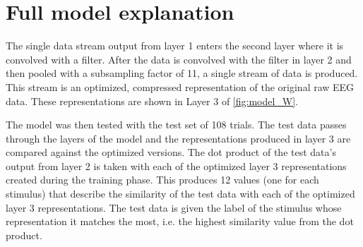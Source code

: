 \section{Full model explanation}
The single data stream output from layer 1 enters the second layer where it is convolved with a filter. 
After the data is convolved with the filter in layer 2 and then pooled with a subsampling factor of 11, a single stream of data is produced.
This stream is an optimized, compressed representation of the original raw EEG data.
These representations are shown in Layer 3 of \autoref{fig:model_W}. 

The model was then tested with the test set of 108 trials. 
The test data passes through the layers of the model and the representations produced in layer 3 are compared against the optimized versions. 
The dot product of the test data's output from layer 2 is taken with each of the optimized layer 3 representations created during the training phase. 
This produces 12 values (one for each stimulus) that describe the similarity of the test data with each of the optimized layer 3 representations. 
The test data is given the label of the stimulus whose representation it matches the most, i.e. the highest similarity value from the dot product. 